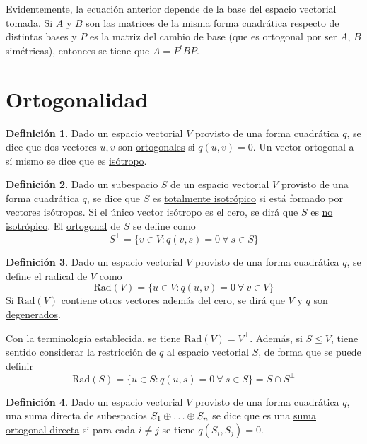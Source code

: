 \documentclass[12pt]{report}
\theoremstyle{definition}
\newtheorem{definition}{Definición}[chapter]
\theoremstyle{definition}
\theoremstyle{remark}
\begin{document}
Evidentemente, la ecuación anterior depende de la base del espacio vectorial tomada. Si $A$ y $B$ son las matrices de la misma forma cuadrática respecto de distintas bases y $P$ es la matriz del cambio de base (que es ortogonal por ser $A$, $B$ simétricas), entonces se tiene que $A = P^tBP$.

\section{Ortogonalidad}

\begin{definition}
Dado un espacio vectorial $V$ provisto de una forma cuadrática $q$, se dice que dos vectores $u, v$ son \ul{ortogonales} si $q(u,v)=0$. Un vector ortogonal a sí mismo se dice que es \ul{isótropo}.
\end{definition}

\begin{definition}
Dado un subespacio $S$ de un espacio vectorial $V$ provisto de una forma cuadrática $q$, se dice que $S$ es \ul{totalmente isotrópico} si está formado por vectores isótropos. Si el único vector isótropo es el cero, se dirá que $S$ es \ul{no isotrópico}. El \ul{ortogonal} de $S$ se define como
\[S^\perp = \{v \in V \colon q(v,s) = 0 \ \forall \ s \in S\}\]
\end{definition}

\begin{definition}
Dado un espacio vectorial $V$ provisto de una forma cuadrática $q$, se define el \ul{radical} de $V$ como
\[\textrm{Rad}(V) = \{u \in V \colon q(u,v)=0 \ \forall \ v \in V\}\]
Si $\textrm{Rad}(V)$ contiene otros vectores además del cero, se dirá que $V$ y $q$ son \ul{degenerados}. 

\vspace{2mm} Con la terminología establecida, se tiene $\textrm{Rad}(V)=V^\perp$. Además, si $S \leq V$, tiene sentido considerar la restricción de $q$ al espacio vectorial $S$, de forma que se puede definir
\[\textrm{Rad}(S) = \{u \in S \colon q(u,s)=0 \ \forall \ s \in S\} = S \cap S^\perp\]
\end{definition}

\begin{definition}
Dado un espacio vectorial $V$ provisto de una forma cuadrática $q$, una suma directa de subespacios $S_1 \oplus \mathellipsis \oplus S_n$ se dice que es una \ul{suma ortogonal-directa} si para cada $i \neq j$ se tiene $q(S_i,S_j) = 0$.
\end{definition}
\end{document}
